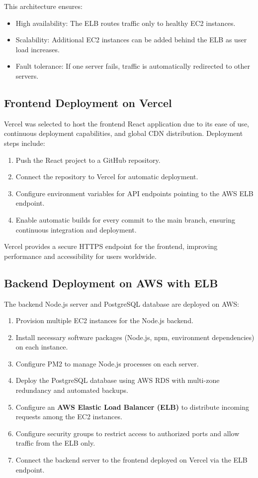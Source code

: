 \documentclass[12pt,a4paper]{article}
\begin{document}
This architecture ensures:

\begin{itemize}
    \item High availability: The ELB routes traffic only to healthy EC2 instances.
    \item Scalability: Additional EC2 instances can be added behind the ELB as user load increases.
    \item Fault tolerance: If one server fails, traffic is automatically redirected to other servers.
\end{itemize}

\subsection{Frontend Deployment on Vercel}

Vercel was selected to host the frontend React application due to its ease of use, continuous deployment capabilities, and global CDN distribution. Deployment steps include:

\begin{enumerate}
    \item Push the React project to a GitHub repository.
    \item Connect the repository to Vercel for automatic deployment.
    \item Configure environment variables for API endpoints pointing to the AWS ELB endpoint.
    \item Enable automatic builds for every commit to the main branch, ensuring continuous integration and deployment.
\end{enumerate}

Vercel provides a secure HTTPS endpoint for the frontend, improving performance and accessibility for users worldwide.

\subsection{Backend Deployment on AWS with ELB}

The backend Node.js server and PostgreSQL database are deployed on AWS:

\begin{enumerate}
    \item Provision multiple EC2 instances for the Node.js backend.
    \item Install necessary software packages (Node.js, npm, environment dependencies) on each instance.
    \item Configure PM2 to manage Node.js processes on each server.
    \item Deploy the PostgreSQL database using AWS RDS with multi-zone redundancy and automated backups.
    \item Configure an \textbf{AWS Elastic Load Balancer (ELB)} to distribute incoming requests among the EC2 instances.
    \item Configure security groups to restrict access to authorized ports and allow traffic from the ELB only.
    \item Connect the backend server to the frontend deployed on Vercel via the ELB endpoint.
\end{enumerate}
\end{document}
